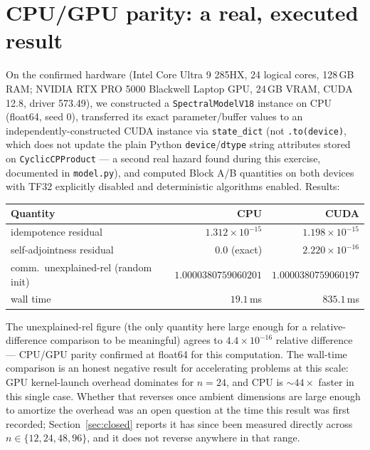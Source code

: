 \documentclass[11pt]{amsart}
\begin{document}
\section{CPU/GPU parity: a real, executed result}
On the confirmed hardware (Intel Core Ultra 9 285HX, 24 logical cores,
128\,GB RAM; NVIDIA RTX PRO 5000 Blackwell Laptop GPU, 24\,GB VRAM, CUDA
12.8, driver 573.49), we constructed a \texttt{SpectralModelV18} instance
on CPU (float64, seed 0), transferred its exact parameter/buffer values
to an independently-constructed CUDA instance via \texttt{state\_dict}
(not \texttt{.to(device)}, which does not update the plain Python
\texttt{device}/\texttt{dtype} string attributes stored on
\texttt{CyclicCPProduct} --- a second real hazard found during this
exercise, documented in \texttt{model.py}), and computed Block A/B
quantities on both devices with TF32 explicitly disabled and
deterministic algorithms enabled. Results:
\begin{center}
\small
\begin{tabular}{lrr}
\toprule
Quantity & CPU & CUDA \\
\midrule
idempotence residual & $1.312\times10^{-15}$ & $1.198\times10^{-15}$ \\
self-adjointness residual & $0.0$ (exact) & $2.220\times10^{-16}$ \\
comm.\ unexplained-rel (random init) & $1.0000380759060201$ & $1.0000380759060197$ \\
wall time & $19.1$\,ms & $835.1$\,ms \\
\bottomrule
\end{tabular}
\end{center}
The unexplained-rel figure (the only quantity here large enough for a
relative-difference comparison to be meaningful) agrees to
$4.4\times10^{-16}$ relative difference --- CPU/GPU parity confirmed at
float64 for this computation. The wall-time comparison is an honest
negative result for accelerating problems at this scale: GPU kernel-launch
overhead dominates for $n=24$, and CPU is $\sim 44\times$ faster in this
single case. Whether that reverses once ambient dimensions are large
enough to amortize the overhead was an open question at the time this
result was first recorded; Section~\ref{sec:closed} reports it has since
been measured directly across $n\in\{12,24,48,96\}$, and it does not
reverse anywhere in that range.
\end{document}
